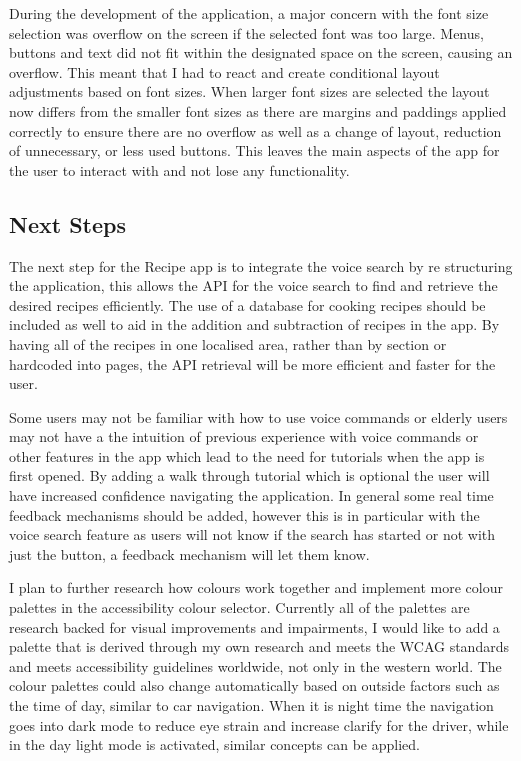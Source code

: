 \documentclass[]{project_final}
\begin{document}
During the development of the application, a major concern with the font size selection was overflow on the screen if the selected font was too large. Menus, buttons and text did not fit within the designated space on the screen, causing an overflow. This meant that I had to react and create conditional layout adjustments based on font sizes.
When larger font sizes are selected the layout now differs from the smaller font sizes as there are margins and paddings applied correctly to ensure there are no overflow as well as a change of layout, reduction of unnecessary, or less used buttons. This leaves the main aspects of the app for the user to interact with and not lose any functionality.

\subsection{Next Steps}

The next step for the Recipe app is to integrate the voice search by re structuring the application, this allows the API for the voice search to find and retrieve the desired recipes efficiently. The use of a database for cooking recipes should be included as well to aid in the addition and subtraction of recipes in the app. By having all of the recipes in one localised area, rather than by section or hardcoded into pages, the API retrieval will be more efficient and faster for the user.

Some users may not be familiar with how to use voice commands or elderly users may not have a the intuition of previous experience with voice commands or other features in the app which lead to the need for tutorials when the app is first opened. By adding a walk through tutorial which is optional the user will have increased confidence navigating the application.
In general some real time feedback mechanisms should be added, however this is in particular with the voice search feature as users will not know if the search has started or not with just the button, a feedback mechanism will let them know.

I plan to further research how colours work together and implement more colour palettes in the accessibility colour selector. Currently all of the palettes are research backed for visual improvements and impairments, I would like to add a palette that is derived through my own research and meets the WCAG standards and meets accessibility guidelines worldwide, not only in the western world.
The colour palettes could also change automatically based on outside factors such as the time of day, similar to car navigation. When it is night time the navigation goes into dark mode to reduce eye strain and increase clarify for the driver, while in the day light mode is activated, similar concepts can be applied.
\end{document}
